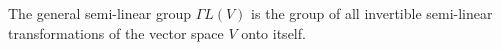 The general semi-linear group $\Gamma L(V)$ is the group of all invertible semi-linear transformations of the vector space $V$ onto itself.
